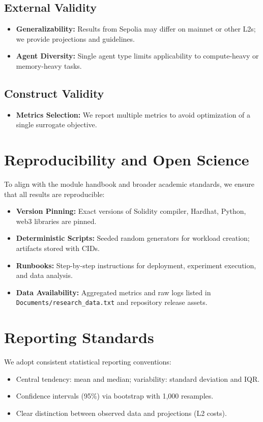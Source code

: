 \subsection{External Validity}
\begin{itemize}
    \item \textbf{Generalizability:} Results from Sepolia may differ on mainnet or other L2s; we provide projections and guidelines.
    \item \textbf{Agent Diversity:} Single agent type limits applicability to compute-heavy or memory-heavy tasks.
\end{itemize}
\subsection{Construct Validity}
\begin{itemize}
    \item \textbf{Metrics Selection:} We report multiple metrics to avoid optimization of a single surrogate objective.
\end{itemize}

\section{Reproducibility and Open Science}

To align with the module handbook and broader academic standards, we ensure that all results are reproducible:
\begin{itemize}
    \item \textbf{Version Pinning:} Exact versions of Solidity compiler, Hardhat, Python, web3 libraries are pinned.
    \item \textbf{Deterministic Scripts:} Seeded random generators for workload creation; artifacts stored with CIDs.
    \item \textbf{Runbooks:} Step-by-step instructions for deployment, experiment execution, and data analysis.
    \item \textbf{Data Availability:} Aggregated metrics and raw logs listed in \texttt{Documents/research\_data.txt} and repository release assets.
\end{itemize}

\section{Reporting Standards}

We adopt consistent statistical reporting conventions:
\begin{itemize}
    \item Central tendency: mean and median; variability: standard deviation and IQR.
    \item Confidence intervals (95\%) via bootstrap with 1,000 resamples.
    \item Clear distinction between observed data and projections (L2 costs).
\end{itemize}
